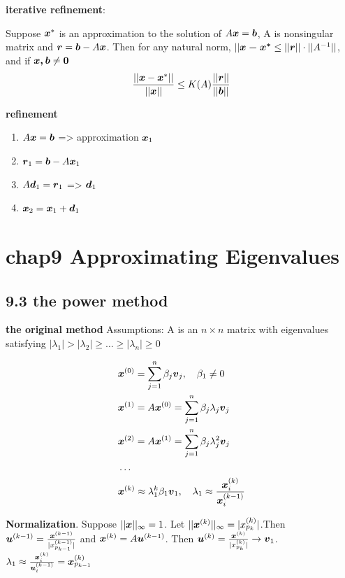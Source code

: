 \documentclass[11pt]{article}
\begin{document}
    \textbf{iterative refinement}:
    \begin{theorem}
      Suppose $\boldsymbol{x}^*$ is an approximation to the solution of $A\boldsymbol{x}=\boldsymbol{b}$, A is
      nonsingular matrix and $\boldsymbol{r}=\boldsymbol{b}-A\boldsymbol{x}$. Then for any natural norm,
      $||\boldsymbol{x-x^*}\le||\boldsymbol{r}||\cdot||A^{-1}||$, and if $\boldsymbol{x,b}\neq\boldsymbol{0}$
      \begin{equation*}
        \frac{||\boldsymbol{x}-\boldsymbol{x}^*||}{||\boldsymbol{x}||}\le K(A)\frac{||\boldsymbol{r}||}{||\boldsymbol{b}||}
      \end{equation*}
    \end{theorem}

    \textbf{refinement}
    \begin{enumerate}
    \item \(A\boldsymbol{x}=\boldsymbol{b}\) => approximation \(\boldsymbol{x}_1\)
    \item \(\boldsymbol{r}_1=\boldsymbol{b}-A\boldsymbol{x}_1\)
    \item \(A\boldsymbol{d}_1=\boldsymbol{r}_1\) => \(\boldsymbol{d}_1\)
    \item \(\boldsymbol{x}_2=\boldsymbol{x}_1+\boldsymbol{d}_1\)
    \end{enumerate}
    \section{chap9 Approximating Eigenvalues}
    \label{sec:org6f2b6c5}
    \subsection{9.3 the power method}
    \label{sec:orgc417679}
    \textbf{the original method}
    Assumptions: A is an \(n\times n\) matrix with eigenvalues satisfying
    \(|\lambda_1|>|\lambda_2|\ge\dots\ge|\lambda_n|\ge 0\)

    \begin{align*}
      &\boldsymbol{x}^{(0)}=\displaystyle\sum_{j=1}^{n}\beta_j\boldsymbol{v}_j,\quad\beta_1\neq 0\\
      &\boldsymbol{x}^{(1)}=A\boldsymbol{x}^{(0)}=\displaystyle\sum_{j=1}^n\beta_j\lambda_j\boldsymbol{v}_j\\
      &\boldsymbol{x}^{(2)}=A\boldsymbol{x}^{(1)}=\displaystyle\sum_{j=1}^n\beta_j\lambda_j^2\boldsymbol{v}_j\\
      &\dots\\
      &\boldsymbol{x}^{(k)}\approx\lambda_1^k\beta_1\boldsymbol{v}_1, \quad \lambda_1\approx
        \frac{\boldsymbol{x}^{(k)}_i}{\boldsymbol{x}^{(k-1)}_i}
    \end{align*}

    \textbf{Normalization}. Suppose \(||\boldsymbol{x}||_\infty=1\). Let
    \(||\boldsymbol{x}^{(k)}||_\infty=|x_{p_k}^{(k)}|\).Then \(\boldsymbol{u}^{(k-1)}=
    \frac{\boldsymbol{x}^{(k-1)}}{|x_{p_{k-1}}^{(k-1)}|}\) and
    \(\boldsymbol{x}^{(k)}=A\boldsymbol{u}^{(k-1)}\).
    Then \(\boldsymbol{u}^{(k)}= \frac{\boldsymbol{x}^{(k)}}{|x_{p_k}^{(k)}|}\to \boldsymbol{v}_1\).
    \(\lambda_1\approx
    \frac{\boldsymbol{x}_i^{(k)}}{\boldsymbol{u}_i^{(k-1)}}=\boldsymbol{x}_{p_{k-1}}^{(k)}\)
\end{document}
